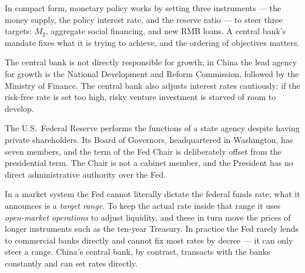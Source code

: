 In compact form, monetary policy works by setting three instruments --- the money supply, the policy interest rate, and the reserve ratio --- to steer three targets: $M_2$, aggregate social financing, and new RMB loans. A central bank's mandate fixes what it is trying to achieve, and the ordering of objectives matters.


The central bank is not directly responsible for growth; in China the lead agency for growth is the National Development and Reform Commission, followed by the Ministry of Finance. The central bank also adjusts interest rates cautiously: if the risk-free rate is set too high, risky venture investment is starved of room to develop.

The U.S.\ Federal Reserve performs the functions of a state agency despite having private shareholders. Its Board of Governors, headquartered in Washington, has seven members, and the term of the Fed Chair is deliberately offset from the presidential term. The Chair is not a cabinet member, and the President has no direct administrative authority over the Fed.


In a market system the Fed cannot literally dictate the federal funds rate; what it announces is a \emph{target range}. To keep the actual rate inside that range it uses \emph{open-market operations} to adjust liquidity, and these in turn move the prices of longer instruments such as the ten-year Treasury. In practice the Fed rarely lends to commercial banks directly and cannot fix most rates by decree --- it can only steer a range. China's central bank, by contrast, transacts with the banks constantly and can set rates directly.

